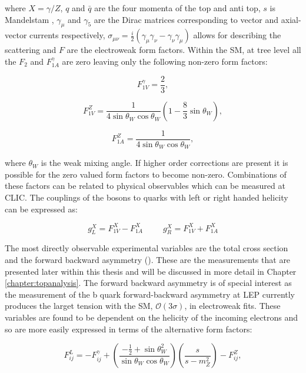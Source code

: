 where $X=\gamma /Z$, $q$ and $\bar{q}$ are the four momenta of the top and anti top, $s$ is Mandelstam , $\gamma_\mu$ and $\gamma_5$ are the Dirac matrices corresponding to vector and axial-vector currents respectively, $\sigma_{\mu\nu}=\frac{i}{2}(\gamma_\mu \gamma_\nu -\gamma_\nu \gamma_\mu)$ allows for describing the scattering and $F$ are the electroweak form factors. Within the \ac{SM}, at tree level all the $F_2$ and $F_{1A}^{\gamma}$ are zero leaving only the following non-zero form factors:

\begin{equation}
F_{1V}^{\gamma}=\frac{2}{3},
\end{equation}

\begin{equation}
F_{1V}^{Z}=\frac{1}{4\sin\theta_{W}\cos\theta_{W}}(1-\frac{8}{3}\sin\theta_{W}),
\end{equation}

\begin{equation}
F_{1A}^{Z}=\frac{1}{4\sin\theta_{W}\cos\theta_{W}},
\end{equation}

where $\theta_W$ is the weak mixing angle. If higher order corrections are present it is possible for the zero valued form factors to become non-zero. Combinations of these factors can be related to physical observables which can be measured at CLIC. The couplings of the bosons to quarks with left or right handed helicity can be expressed as:

\begin{equation}
g_L^X = F_{1V}^{X} - F_{1A}^{X} ~~~~~~~~~~~ g_R^X = F_{1V}^{X} + F_{1A}^{X}
\end{equation}

The most directly observable experimental variables are the total cross section and the forward backward asymmetry (\afb). These are the measurements that are presented later within this thesis and will be discussed in more detail in Chapter \ref{chapter:topanalysis}. The forward backward asymmetry is of special interest as the measurement of the b quark forward-backward asymmetry at \ac{LEP}\cite{ABBIENDI200229} currently produces the larget tension with the \ac{SM}, $\mathcal{O}(3\sigma)$\cite{ALEPH:2005ab}, in electroweak fits. These variables are found to be dependent on the helicity of the incoming electrons \cite{Schmidt:1995mr} and so are more easily expressed in terms of the alternative form factors:

\begin{equation}
F_{ij}^{L} = -F_{ij}^{\gamma} +(\frac{-\frac{1}{2} +\sin\theta_W^2}{\sin\theta_W\cos\theta_W})(\frac{s}{s-m_Z^2}) -F_{ij}^{Z},
\end{equation}

